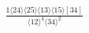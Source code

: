 \documentclass[varwidth, border=5pt]{standalone}
\begin{document}
\begin{my}
$\begin{gathered}
\scriptscriptstyle\frac{1⟨24⟩⟨25⟩⟨13⟩⟨15⟩[34]}{⟨12⟩^4⟨34⟩^2}
\end{gathered}$
\end{my}
\end{document}
